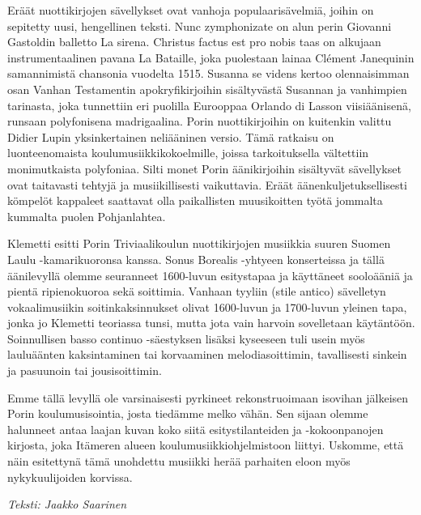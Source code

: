 Eräät nuottikirjojen sävellykset ovat vanhoja populaarisävelmiä, joihin on sepitetty uusi, hengellinen teksti. Nunc zymphonizate on alun perin Giovanni Gastoldin balletto La sirena. Christus factus est pro nobis taas on alkujaan instrumentaalinen pavana La Bataille, joka puolestaan lainaa Clément Janequinin samannimistä chansonia vuodelta 1515. Susanna se videns kertoo olennai­simman osan Vanhan Testamentin apokryfikirjoihin sisältyvästä Susannan ja vanhimpien tarinasta, joka tunnettiin eri puolilla Eurooppaa Orlando di Lasson viisiäänisenä, runsaan polyfonisena madrigaalina. Porin nuottikirjoihin on kuitenkin valittu Didier Lupin yksinkertainen neliääninen versio. Tämä ratkaisu on luonteenomaista koulumusiikkikokoelmille, joissa tarkoituksella vältettiin monimutkaista polyfoniaa. Silti monet Porin ääni­kirjoihin sisältyvät sävellykset ovat taitavasti tehtyjä ja musiikillisesti vaikuttavia. Eräät äänenkuljetuksellisesti kömpelöt kappaleet saattavat olla paikallisten muusikoitten työtä jommalta kummalta puolen Pohjanlahtea.

Klemetti esitti Porin Triviaalikoulun nuottikirjojen musiikkia suuren Suomen Laulu -kamari\-kuoronsa kanssa. Sonus Borealis -yhtyeen konserteissa ja tällä äänilevyllä olemme seuranneet 1600-luvun esitystapaa ja käyttäneet sooloääniä ja pientä ripienokuoroa sekä soittimia. Vanhaan tyyliin (stile antico) sävelletyn vokaalimusiikin soitinkaksinnukset olivat 1600-luvun ja 1700-luvun yleinen tapa, jonka jo Klemetti teoriassa tunsi, mutta jota vain harvoin sovelletaan käytäntöön. Soinnullisen basso continuo -säestyksen lisäksi kyseeseen tuli usein myös lauluäänten kaksintaminen tai korvaaminen melodiasoittimin, tavallisesti sinkein ja pasuunoin tai jousisoittimin.

Emme tällä levyllä ole varsinaisesti pyrkineet rekonstruoimaan isovihan jälkeisen Porin koulumusisointia, josta tiedämme melko vähän. Sen sijaan olemme halunneet antaa laajan kuvan koko siitä esitystilanteiden ja -kokoonpanojen kirjosta, joka Itämeren alueen koulumusiikkiohjelmistoon liittyi. Uskomme, että näin esitettynä tämä unohdettu musiikki herää parhaiten eloon myös nykykuulijoiden korvissa.

\textit{Teksti: Jaakko Saarinen}
